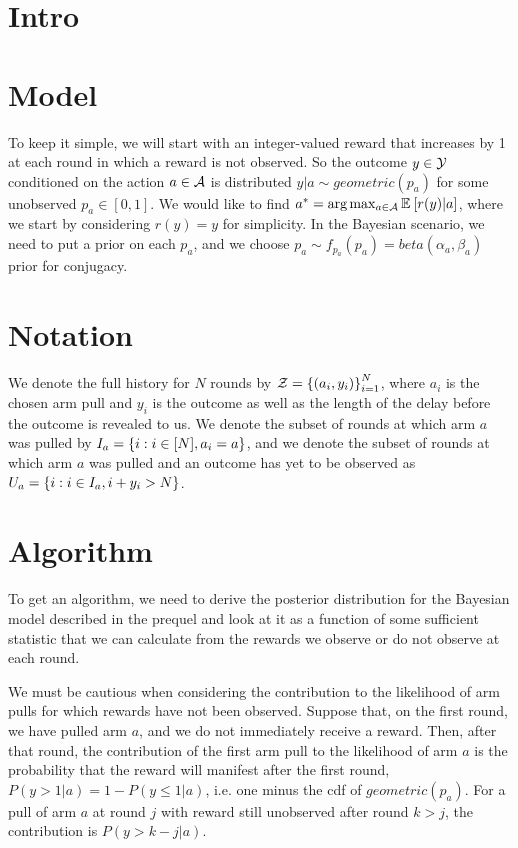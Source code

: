 \documentclass{article}
\begin{document}
\section{Intro} \label{sec:intro}
\section{Model} \label{sec:model}

To keep it simple, we will start with an integer-valued reward that increases by 1 at each round in which a reward is not observed. So the outcome $y \in \mathcal{Y}$ conditioned on the action $a \in \mathcal{A}$ is distributed $y | a \sim geometric(p_a)$ for some unobserved $p_a \in [0,1]$. We would like to find $a^* = \textnormal{arg} \max_{a \in \mathcal{A}} \mathbb{E}_{} \left[ r(y) | a \right]$, where we start by considering $r(y) = y$ for simplicity. In the Bayesian scenario, we need to put a prior on each $p_a$, and we choose $p_a \sim f_{p_a}(p_a) = beta(\alpha_a, \beta_a)$ prior for conjugacy.

\section{Notation} \label{subsec:notation}
We denote the full history for $N$ rounds by $\mathcal{Z} = \left \{ (a_i, y_i) \right \}_{i=1}^N$, where $a_i$ is the chosen arm pull and $y_i$ is the outcome as well as the length of the delay before the outcome is revealed to us. We denote the subset of rounds at which arm $a$ was pulled by $I_a = \left \{ i: i \in [N], a_i = a \right \}$, and we denote the subset of rounds at which arm $a$ was pulled and an outcome has yet to be observed as $U_a = \left \{ i : i \in I_a, i + y_i > N \right \}$.

\section{Algorithm} \label{sec:alg}
To get an algorithm, we need to derive the posterior distribution for the Bayesian model described in the prequel and look at it as a function of some sufficient statistic that we can calculate from the rewards we observe or do not observe at each round. 

We must be cautious when considering the contribution to the likelihood of arm pulls for which rewards have not been observed. Suppose that, on the first round, we have pulled arm $a$, and we do not immediately receive a reward. Then, after that round, the contribution of the first arm pull to the likelihood of arm $a$ is the probability that the reward will manifest after the first round, $P(y > 1 | a) = 1 - P(y \leq 1 | a)$, i.e. one minus the cdf of $geometric(p_a)$. For a pull of arm $a$ at round $j$ with reward still unobserved after round $k > j$, the contribution is $P(y > k - j | a)$.
\end{document}
